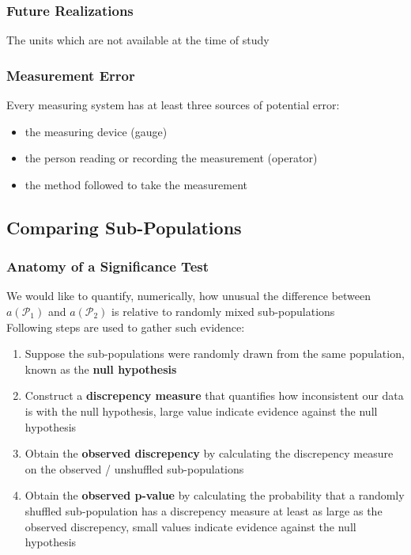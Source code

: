 \documentclass[11pt]{article}
\begin{document}
\subsubsection*{Future Realizations}
The units which are not available at the time of study 
\subsubsection{Measurement Error}
Every measuring system has at least three sources of potential error:
\begin{itemize}
    \item the measuring device (gauge)
    \item the person reading or recording the measurement (operator)
    \item the method followed to take the measurement 
\end{itemize}

\subsection{Comparing Sub-Populations}
\subsubsection{Anatomy of a Significance Test}
We would like to quantify, numerically, how unusual the difference between $a(\mathcal{P}_1)$ and $a(\mathcal{P}_2)$ is relative to randomly mixed sub-populations \\
Following steps are used to gather such evidence:
\begin{enumerate}
    \item Suppose the sub-populations were randomly drawn from the same population, known as the \textbf{null hypothesis}
    \item Construct a \textbf{discrepency measure} that quantifies how inconsistent our data is with the null hypothesis, large value indicate evidence against the null hypothesis 
    \item Obtain the \textbf{observed discrepency} by calculating the discrepency measure on the observed / unshuffled sub-populations 
    \item Obtain the \textbf{observed p-value} by calculating the probability that a randomly shuffled sub-population has a discrepency measure at least as large as the observed discrepency, small values indicate evidence against the null hypothesis 
\end{enumerate}
\end{document}
